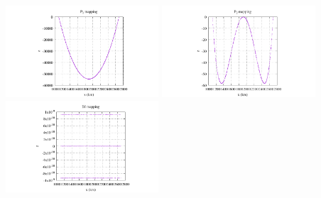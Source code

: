 \begin{center}
\includegraphics[width=5.7cm]{images/mappings/DJ/quadrilaterals/xz_P1_boundary_error.pdf}
\includegraphics[width=5.7cm]{images/mappings/DJ/quadrilaterals/xz_P2_boundary_error.pdf}
\includegraphics[width=5.7cm]{images/mappings/DJ/quadrilaterals/xz_DJ_boundary_error.pdf}
\end{center}

